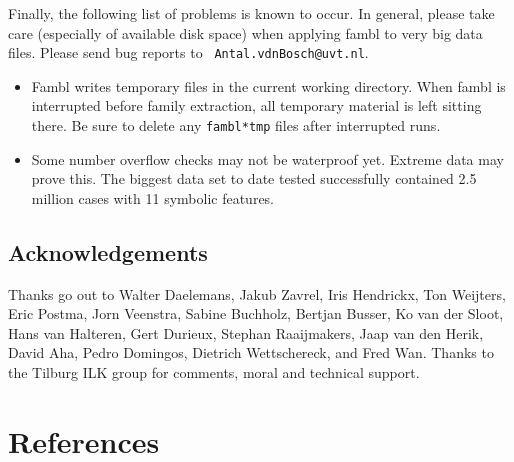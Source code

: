 \documentclass[11pt]{article}
\begin{document}
Finally, the following list of problems is known to occur. In general,
please take care (especially of available disk space) when applying
{\sc fambl} to very big data files. Please send bug reports to  {\tt
Antal.vdnBosch@uvt.nl}.

\begin{itemize}
\item
{\sc Fambl} writes temporary files in the current working directory. When
{\sc fambl} is interrupted before family extraction, all temporary material
is left sitting there. Be sure to delete any {\tt fambl*tmp} files after
interrupted runs.
\item
Some number overflow checks may not be waterproof yet. Extreme data may
prove this. The biggest data set to date tested successfully contained
2.5 million cases with 11 symbolic features.
\end{itemize}

\subsection*{Acknowledgements}

Thanks go out to Walter Daelemans, Jakub Zavrel, Iris Hendrickx, Ton
Weijters, Eric Postma, Jorn Veenstra, Sabine Buchholz, Bertjan Busser,
Ko van der Sloot, Hans van Halteren, Gert Durieux, Stephan
Raaijmakers, Jaap van den Herik, David Aha, Pedro Domingos, Dietrich
Wettschereck, and Fred Wan. Thanks to the Tilburg ILK group for
comments, moral and technical support.

\section*{References}
\label{refs}
\end{document}
